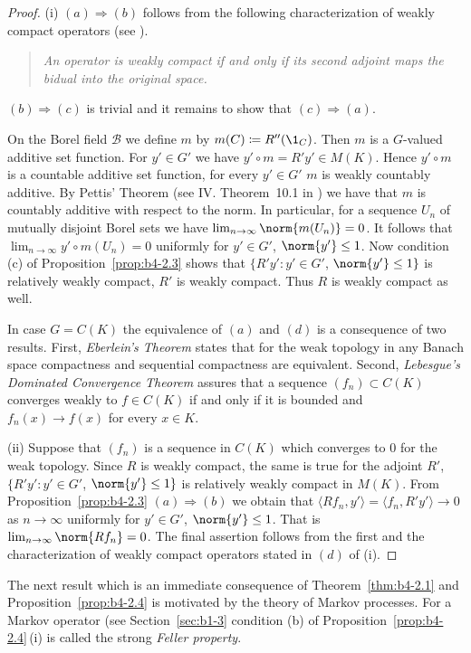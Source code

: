 \begin{proof}
(i) $(a)\Rightarrow(b)$ follows from the following characterization of
weakly compact operators (see \eg \textcite[II. Proposition~9.4 ]{schaefer:1974}).
\begin{quote}
    \emph{
    An operator is weakly compact if and only if its second adjoint
    maps the bidual into the original space.
    }
\end{quote}
$(b)\Rightarrow(c)$ is trivial and it remains to show that $(c) \Rightarrow (a)$.

On the Borel field $\mathcal{B}$ we define $m$ by $m(C)  \coloneq  R''(\1_C)$.
Then $m$ is
a $G$-valued additive set function.
For $y' \in G'$ we have
$y'\circ m = R'y' \in M(K)$.
Hence $y'\circ m$ is a countable additive set function, for every $y' \in G'$  \ie $m$ is weakly countably additive.
By Pettis' Theorem (see IV. Theorem~10.1 in 
\textcite{dunfordschwartz:1958}) we have
that $m$ is countably additive with respect to the norm.
In particular, for a sequence $U_n$ of mutually disjoint Borel sets we have
$\lim_{n\to\infty}\norm{m(U_n)} = 0$.
It follows that $\lim_{n\to\infty}y'\circ m(U_n) = 0$ uniformly for
$y' \in G'$, $\norm{y'} \leq 1$.
Now condition (c) of Proposition~\ref{prop:b4-2.3} shows that $\{R'y'
\colon y' \in G'$, $\norm{y'} \leq 1\}$ is relatively weakly compact, \ie  $R'$ is
weakly compact.
Thus $R$ is weakly compact as well.

In case $G = C(K)$ the equivalence of\/ $(a)$ and $(d)$ is a consequence of
two results. First, \emph{Eberlein's Theorem} states that for the weak topology in any Banach space compactness and sequential compactness are
equivalent.
Second, \emph{Lebesgue's Dominated Convergence Theorem} assures
that a sequence $(f_n) \subset C(K)$ converges weakly to $f \in C(K)$ if and
only if it is bounded and $f_n(x) \to f(x)$ for every $x \in K$.
	
(ii) Suppose that $(f_n)$ is a sequence in $C(K)$ which converges to $0$ for
the weak topology.
Since $R$ is weakly compact, the same is true for
the adjoint $R'$, \ie $\{R'y' \colon y' \in G'$, $\norm{y'} \leq 1\}$ is relatively weakly compact in $M(K)$.
From Proposition~\ref{prop:b4-2.3} $(a)\Rightarrow(b)$ we obtain that
$\langle Rf_n,y'\rangle = \langle f_n,R'y'\rangle \to 0$ as $n \to \infty$ uniformly for $y' \in G'$, $\norm{y'}\leq1$.
That is $\lim_{n\to\infty}\norm{Rf_n} = 0$.
The final assertion follows from the first and the characterization of
weakly compact operators stated in $(d)$ of (i).
\end{proof}
The next result which is an immediate consequence of Theorem~\ref{thm:b4-2.1} and
Proposition~\ref{prop:b4-2.4} is motivated by the theory of Markov processes.
For a Markov operator (see Section~\ref{sec:b1-3} condition (b) of Proposition~\ref{prop:b4-2.4}\,(i) is called the strong \emph{Feller property}. 

